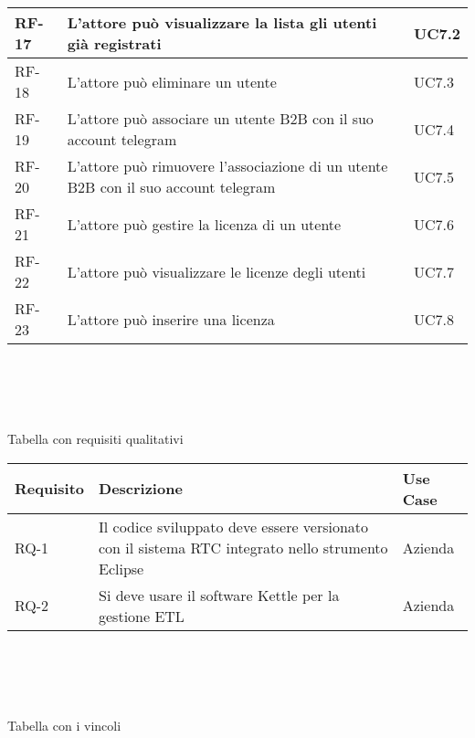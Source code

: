 \begin{tabular}{ |p{2cm}|p{8cm}|p{2cm}| }
\hline
RF-17   & L’attore può visualizzare la lista gli utenti già registrati   & UC7.2 \\
\hline
RF-18   & L’attore può eliminare un utente  & UC7.3 \\
\hline
RF-19   &  L’attore può associare un utente B2B con il suo account telegram  & UC7.4 \\
\hline
RF-20  &  L’attore può rimuovere l’associazione di un utente B2B con il suo account telegram & UC7.5 \\
\hline
RF-21   &  L’attore può gestire la licenza di un utente  & UC7.6 \\
\hline
RF-22   &  L’attore può visualizzare le licenze degli utenti & UC7.7 \\
\hline
RF-23   & L’attore può inserire una  licenza  & UC7.8 \\
\hline
\end{tabular}
\\ \\ \\ \\

Tabella con requisiti qualitativi \\

\begin{tabular}{ |p{2cm}|p{8cm}|p{2cm}| }
 

 \hline
\textbf{ Requisito}   &  \textbf{Descrizione}    &  \textbf{    Use Case} \\ 
\hline
RQ-1  &  Il codice sviluppato deve essere versionato con il sistema RTC integrato nello strumento Eclipse & Azienda \\
\hline
RQ-2 &  Si deve usare il software Kettle per la gestione ETL & Azienda \\
\hline
\end{tabular}
\\ \\ \\ \\

Tabella con i vincoli \\



